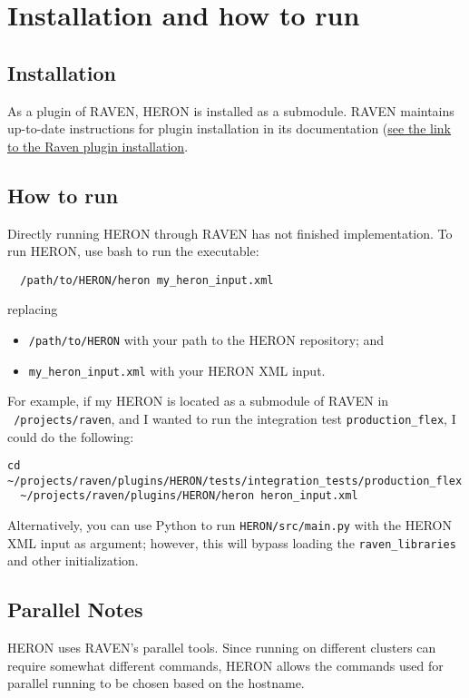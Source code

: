 \section{ Installation and how to run}

\subsection{Installation}
As a plugin of RAVEN, HERON is installed as a submodule. RAVEN maintains up-to-date instructions for
plugin installation in its documentation
(\href{https://github.com/idaholab/raven/wiki/Plugins}{see the link to the Raven plugin
installation}.

\subsection{How to run}
Directly running HERON through RAVEN has not finished implementation. To run HERON, use bash to
run the executable:
\begin{lstlisting}
  /path/to/HERON/heron my_heron_input.xml
\end{lstlisting}
replacing
\begin{itemize}
  \item \texttt{/path/to/HERON} with your path to the HERON repository; and
  \item \texttt{my\_heron\_input.xml} with your HERON XML input.
\end{itemize}
For example, if my HERON is located as a submodule of RAVEN in \texttt{~/projects/raven}, and I
wanted to run the integration test \texttt{production\_flex}, I could do the following:
\begin{lstlisting}[basicstyle=\footnotesize]
  cd ~/projects/raven/plugins/HERON/tests/integration_tests/production_flex
  ~/projects/raven/plugins/HERON/heron heron_input.xml
\end{lstlisting}
Alternatively, you can use Python to run \texttt{HERON/src/main.py} with the HERON XML input as
argument; however, this will bypass loading the \texttt{raven\_libraries} and other initialization.

\subsection{Parallel Notes}

HERON uses RAVEN's parallel tools. Since running on different clusters
can require somewhat different commands, HERON allows the commands
used for parallel running to be chosen based on the hostname.

